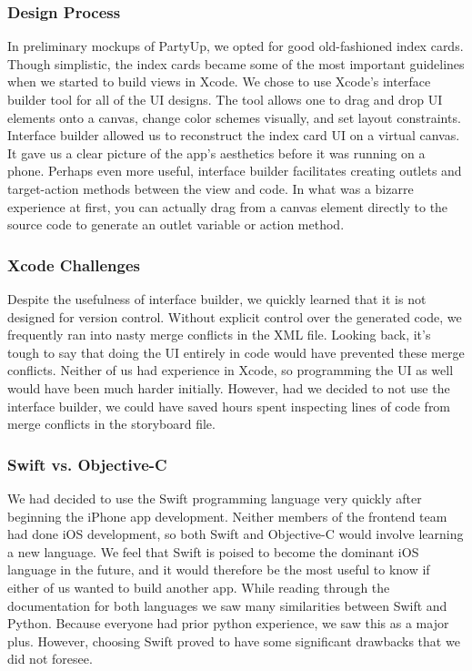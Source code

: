 \documentclass[12pt]{article}
\begin{document}
\subsubsection{Design Process}


In preliminary mockups of PartyUp, we opted for good old-fashioned index cards. Though simplistic, the index cards became some of the most important guidelines when we started to build views in Xcode.
We chose to use Xcode's interface builder tool for all of the UI designs. The tool allows one to drag and drop UI elements onto a canvas, change color schemes visually, and set layout constraints.
Interface builder allowed us to reconstruct the index card UI on a virtual canvas. It gave us a clear picture of the app's aesthetics before it was running on a phone. 
Perhaps even more useful, interface builder facilitates creating outlets and target-action methods between the view and code. 
In what was a bizarre experience at first, you can actually drag from a canvas element directly to the source code to generate an outlet variable or action method. 

\subsubsection{Xcode Challenges}

Despite the usefulness of interface builder, we quickly learned that it is not designed for version control.
Without explicit control over the generated code, we frequently ran into nasty merge conflicts in the XML file.
Looking back, it's tough to say that doing the UI entirely in code would have prevented these merge conflicts. 
Neither of us had experience in Xcode, so programming the UI as well would have been much harder initially. 
However, had we decided to not use the interface builder, we could have saved hours spent inspecting lines of code from merge conflicts in the storyboard file. 

\subsubsection{Swift vs. Objective-C}
We had decided to use the Swift programming language very quickly after beginning the iPhone app development.
Neither members of the frontend team had done iOS development, so both Swift and Objective-C would involve learning a new language. 
We feel that Swift is poised to become the dominant iOS language in the future, and it would therefore be the most useful to know if either of us wanted to build another app. 
While reading through the documentation for both languages we saw many similarities between Swift and Python. 
Because everyone had prior python experience, we saw this as a major plus. 
However, choosing Swift proved to have some significant drawbacks that we did not foresee. 
\end{document}
